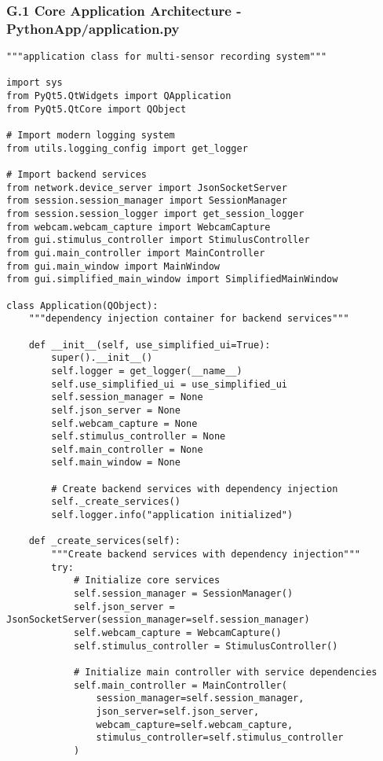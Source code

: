\documentclass[11pt,a4paper]{article}
\begin{document}
{{\subsubsection{G.1 Core Application Architecture - PythonApp/application.py}

\begin{verbatim}
"""application class for multi-sensor recording system"""

import sys
from PyQt5.QtWidgets import QApplication
from PyQt5.QtCore import QObject

# Import modern logging system
from utils.logging_config import get_logger

# Import backend services
from network.device_server import JsonSocketServer
from session.session_manager import SessionManager
from session.session_logger import get_session_logger
from webcam.webcam_capture import WebcamCapture
from gui.stimulus_controller import StimulusController
from gui.main_controller import MainController
from gui.main_window import MainWindow
from gui.simplified_main_window import SimplifiedMainWindow

class Application(QObject):
    """dependency injection container for backend services"""

    def __init__(self, use_simplified_ui=True):
        super().__init__()
        self.logger = get_logger(__name__)
        self.use_simplified_ui = use_simplified_ui
        self.session_manager = None
        self.json_server = None
        self.webcam_capture = None
        self.stimulus_controller = None
        self.main_controller = None
        self.main_window = None

        # Create backend services with dependency injection
        self._create_services()
        self.logger.info("application initialized")

    def _create_services(self):
        """Create backend services with dependency injection"""
        try:
            # Initialize core services
            self.session_manager = SessionManager()
            self.json_server = JsonSocketServer(session_manager=self.session_manager)
            self.webcam_capture = WebcamCapture()
            self.stimulus_controller = StimulusController()

            # Initialize main controller with service dependencies
            self.main_controller = MainController(
                session_manager=self.session_manager,
                json_server=self.json_server,
                webcam_capture=self.webcam_capture,
                stimulus_controller=self.stimulus_controller
            )


\end{verbatim}}}
\end{document}
